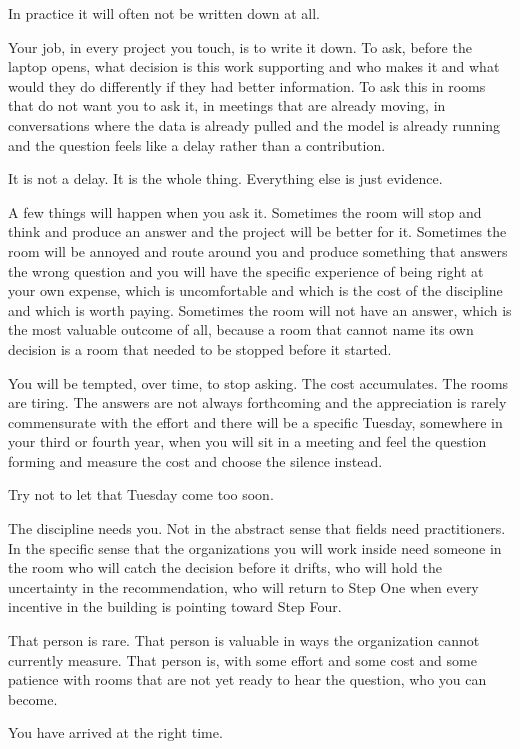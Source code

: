 In practice it will often not be written down at all.

Your job, in every project you touch, is to write it down. To ask, before the laptop opens, what decision is this work supporting and who makes it and what would they do differently if they had better information. To ask this in rooms that do not want you to ask it, in meetings that are already moving, in conversations where the data is already pulled and the model is already running and the question feels like a delay rather than a contribution.

It is not a delay. It is the whole thing. Everything else is just evidence.

A few things will happen when you ask it. Sometimes the room will stop and think and produce an answer and the project will be better for it. Sometimes the room will be annoyed and route around you and produce something that answers the wrong question and you will have the specific experience of being right at your own expense, which is uncomfortable and which is the cost of the discipline and which is worth paying. Sometimes the room will not have an answer, which is the most valuable outcome of all, because a room that cannot name its own decision is a room that needed to be stopped before it started.

You will be tempted, over time, to stop asking. The cost accumulates. The rooms are tiring. The answers are not always forthcoming and the appreciation is rarely commensurate with the effort and there will be a specific Tuesday, somewhere in your third or fourth year, when you will sit in a meeting and feel the question forming and measure the cost and choose the silence instead.

Try not to let that Tuesday come too soon.

The discipline needs you. Not in the abstract sense that fields need practitioners. In the specific sense that the organizations you will work inside need someone in the room who will catch the decision before it drifts, who will hold the uncertainty in the recommendation, who will return to Step One when every incentive in the building is pointing toward Step Four.

That person is rare. That person is valuable in ways the organization cannot currently measure. That person is, with some effort and some cost and some patience with rooms that are not yet ready to hear the question, who you can become.

You have arrived at the right time.

